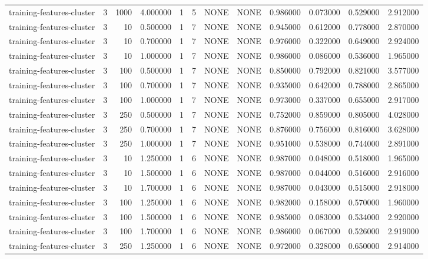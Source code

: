 \begin{tabular}{lrrrllllrrrr}
training-features-cluster & 3 & 1000 & 4.000000 & 1 & 5 & NONE & NONE & 0.986000 & 0.073000 & 0.529000 & 2.912000 \\
training-features-cluster & 3 & 10 & 0.500000 & 1 & 7 & NONE & NONE & 0.945000 & 0.612000 & 0.778000 & 2.870000 \\
training-features-cluster & 3 & 10 & 0.700000 & 1 & 7 & NONE & NONE & 0.976000 & 0.322000 & 0.649000 & 2.924000 \\
training-features-cluster & 3 & 10 & 1.000000 & 1 & 7 & NONE & NONE & 0.986000 & 0.086000 & 0.536000 & 1.965000 \\
training-features-cluster & 3 & 100 & 0.500000 & 1 & 7 & NONE & NONE & 0.850000 & 0.792000 & 0.821000 & 3.577000 \\
training-features-cluster & 3 & 100 & 0.700000 & 1 & 7 & NONE & NONE & 0.935000 & 0.642000 & 0.788000 & 2.865000 \\
training-features-cluster & 3 & 100 & 1.000000 & 1 & 7 & NONE & NONE & 0.973000 & 0.337000 & 0.655000 & 2.917000 \\
training-features-cluster & 3 & 250 & 0.500000 & 1 & 7 & NONE & NONE & 0.752000 & 0.859000 & 0.805000 & 4.028000 \\
training-features-cluster & 3 & 250 & 0.700000 & 1 & 7 & NONE & NONE & 0.876000 & 0.756000 & 0.816000 & 3.628000 \\
training-features-cluster & 3 & 250 & 1.000000 & 1 & 7 & NONE & NONE & 0.951000 & 0.538000 & 0.744000 & 2.891000 \\
training-features-cluster & 3 & 10 & 1.250000 & 1 & 6 & NONE & NONE & 0.987000 & 0.048000 & 0.518000 & 1.965000 \\
training-features-cluster & 3 & 10 & 1.500000 & 1 & 6 & NONE & NONE & 0.987000 & 0.044000 & 0.516000 & 2.916000 \\
training-features-cluster & 3 & 10 & 1.700000 & 1 & 6 & NONE & NONE & 0.987000 & 0.043000 & 0.515000 & 2.918000 \\
training-features-cluster & 3 & 100 & 1.250000 & 1 & 6 & NONE & NONE & 0.982000 & 0.158000 & 0.570000 & 1.960000 \\
training-features-cluster & 3 & 100 & 1.500000 & 1 & 6 & NONE & NONE & 0.985000 & 0.083000 & 0.534000 & 2.920000 \\
training-features-cluster & 3 & 100 & 1.700000 & 1 & 6 & NONE & NONE & 0.986000 & 0.067000 & 0.526000 & 2.919000 \\
training-features-cluster & 3 & 250 & 1.250000 & 1 & 6 & NONE & NONE & 0.972000 & 0.328000 & 0.650000 & 2.914000 \\

\end{tabular}
